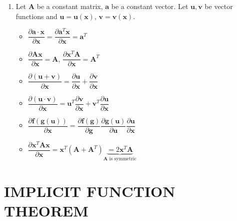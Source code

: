 \documentclass[%
 aip,
 jmp,%
 amsmath,amssymb,
 reprint,%
]{revtex4-1}
\renewcommand{\vec}[1]{\bm{#1}}
\newcommand{\mat}[1]{\bm{#1}}
\newcommand{\vfun}[1]{\bm{#1}}
\newcommand{\term}[1]{\libertineSB{#1}\normalfont}
\newcommand{\R}[1]{\mathbb{R}^{#1}}    %
\newcommand{\C}[1]{\mathcal{C}^{#1}}   %
\begin{document}
\begin{enumerate}
\item Let $\mat{A}$ be a constant matrix, $\vec{a}$ be a constant vector. Let $\vfun{u}, \vfun{v}$ be
      vector functions and $\vec{u} = \vfun{u}(\vec{x})$, $\vec{v} = \vfun{v}(\vec{x})$.
        \begin{itemize}
            \item $\dfrac{\partial \vec{a} \cdot \vec{x}}{\partial \vec{x}} =
                   \dfrac{\partial \vec{a}^T  \vec{x}}{\partial \vec{x}} = \vec{a}^T $
            \item $\dfrac{\partial \mat{A}\vec{x}}{\partial \vec{x}} = \mat{A}$,
                  $\dfrac{\partial \vec{x}^T\mat{A}}{\partial \vec{x}} = \mat{A}^{T}$
            \item $\dfrac{\partial (\vfun{u} + \vfun{v})}{\partial \vec{x}} =
                   \dfrac{\partial \vfun{u}}{\partial \vec{x}} +
                   \dfrac{\partial \vfun{v}}{\partial \vec{x}} $
            \item $\dfrac{\partial (\vfun{u} \cdot \vfun{v})}{\partial \vec{x}} =
                   \vec{u}^T \dfrac{\partial \vfun{v}}{\partial \vec{x}} +
                   \vec{v}^T \dfrac{\partial \vfun{u}}{\partial \vec{x}} $
            \item $\dfrac{\partial \vfun{f}(\vfun{g}(\vfun{u}))}{\partial \vec{x}} =
                   \dfrac{\partial \vfun{f}(\vec{g})}{\partial \vec{g}}
                   \dfrac{\partial \vfun{g}(\vec{u})}{\partial \vec{u}}
                   \dfrac{\partial \vfun{u}}{\partial \vec{x}} $
            \item $\dfrac{\partial \vec{x}^T \mat{A} \vec{x}}{\partial \vec{x}} =
                   \vec{x}^T (\mat{A} + \mat{A}^T)
                   \underbrace{= 2\vec{x}^T \mat{A}}_{\mat{A} \textrm{ is symmetric}} $
        \end{itemize}



\end{enumerate}


\section{IMPLICIT FUNCTION THEOREM}
\end{document}

